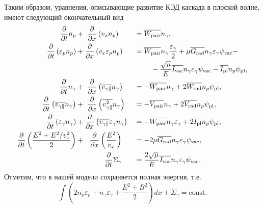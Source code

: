 Таким образом, уравнения, описывающие развитие КЭД каскада в плоской волне, имеют следующий окончательный вид
\begin{alignat}{3}
    \label{eq:ch2/fin1}
    \pdv{}{t}n_p  &+\ \pdv{}{x}\left( v_x n_p \right) &&= \overline{W_\mathrm{pair}} n_\gamma  ,\\
    \label{eq:ch2/fin2}
    \pdv{}{t}\left( \varepsilon_p n_p \right)  &+ \pdv{}{x}\left( v_x \varepsilon_p n_p \right) &&= 
    \begin{multlined}[t]
        \overline{W_\mathrm{pair}} n_\gamma \frac{\varepsilon_\gamma}{2}  + \mu \overline{G_\mathrm{rad}} n_\gamma\varepsilon_\gamma \psi_\mathrm{vac} - \\
        - \frac{\sqrt{\mu}}{E} \overline{I_\mathrm{vac}} n_\gamma\varepsilon_\gamma \psi_\mathrm{vac} - \overline{I_\mathrm{pl}} n_p \psi_\mathrm{pl} ,
    \end{multlined} \\
    \label{eq:ch2/fin3}
    \pdv{}{t}n_\gamma  &+\ \pdv{}{x}\left( \overline{v_{\gamma\parallel}} n_\gamma \right)&&=-\overline{W_\mathrm{pair}} n_\gamma + 2\overline{W_\mathrm{rad}} n_p \psi_\mathrm{pl} ,\\
    \label{eq:ch2/fin4}
    \pdv{}{t}\left( \overline{v_{\gamma\parallel}} n_\gamma \right) &+\  \pdv{}{x}\left( \overline{v_{\gamma\parallel}^2} n_\gamma \right) &&= -\overline{V_\mathrm{pair}} n_\gamma + 2 \overline{V_\mathrm{rad}} n_p \psi_\mathrm{pl} ,\\
    \label{eq:ch2/fin5}
    \pdv{}{t}\left( \varepsilon_\gamma n_\gamma \right) &+\pdv{}{x}\left( \overline{v_{\gamma\parallel}} \varepsilon_\gamma n_\gamma \right) &&=-\overline{W_\mathrm{pair}}n_\gamma\varepsilon_\gamma   +2 \overline{I_\mathrm{pl}} n_p \psi_\mathrm{pl} ,\\
    \label{eq:ch2/fin6}
    \pdv{}{t}\left( \frac{E^2 + E^2/v_x^2}{2} \right) &+\ \  \pdv{}{x} \left( \frac{E^2}{v_x} \right) &&=  -2\mu \overline{G_\mathrm{rad}} n_\gamma\varepsilon_\gamma\psi_\mathrm{vac}  ,\\
    \label{eq:ch2/fin7}
    &\qquad\qquad \pdv{}{t}\Sigma_\gamma &&=  \frac{2\sqrt{\mu}}{ E} \overline{I_\mathrm{vac}} n_\gamma\varepsilon_\gamma \psi_\mathrm{vac} .
\end{alignat}
Отметим, что в нашей модели сохраняется полная энергия, т.е.
\begin{equation}
    \int \left( 2n_p\varepsilon_p + n_\gamma \varepsilon_\gamma + \frac{E^2 + B^2}{2} \right) dx + \Sigma_\gamma = \text{const} .
\end{equation}

